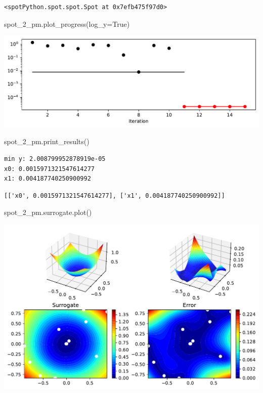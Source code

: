 \documentclass[
  letterpaper,
  DIV=11,
  numbers=noendperiod]{scrreprt}
\newenvironment{Shaded}{\begin{snugshade}}{\end{snugshade}}
\newcommand{\NormalTok}[1]{\textcolor[rgb]{0.00,0.23,0.31}{#1}}
\newcommand{\OperatorTok}[1]{\textcolor[rgb]{0.37,0.37,0.37}{#1}}
\newcommand{\VariableTok}[1]{\textcolor[rgb]{0.07,0.07,0.07}{#1}}
\begin{document}
\begin{verbatim}
<spotPython.spot.spot.Spot at 0x7efb475f97d0>
\end{verbatim}

\begin{Shaded}
\begin{Highlighting}[]
\NormalTok{spot\_2\_pm.plot\_progress(log\_y}\OperatorTok{=}\VariableTok{True}\NormalTok{)}
\end{Highlighting}
\end{Shaded}

\includegraphics{015_num_spot_correlation_p_files/figure-pdf/cell-16-output-1.pdf}

\begin{Shaded}
\begin{Highlighting}[]
\NormalTok{spot\_2\_pm.print\_results()}
\end{Highlighting}
\end{Shaded}

\begin{verbatim}
min y: 2.008799952878919e-05
x0: 0.0015971321547614277
x1: 0.004187740250900992
\end{verbatim}

\begin{verbatim}
[['x0', 0.0015971321547614277], ['x1', 0.004187740250900992]]
\end{verbatim}

\begin{Shaded}
\begin{Highlighting}[]
\NormalTok{spot\_2\_pm.surrogate.plot()}
\end{Highlighting}
\end{Shaded}

\includegraphics{015_num_spot_correlation_p_files/figure-pdf/cell-18-output-1.pdf}
\end{document}
